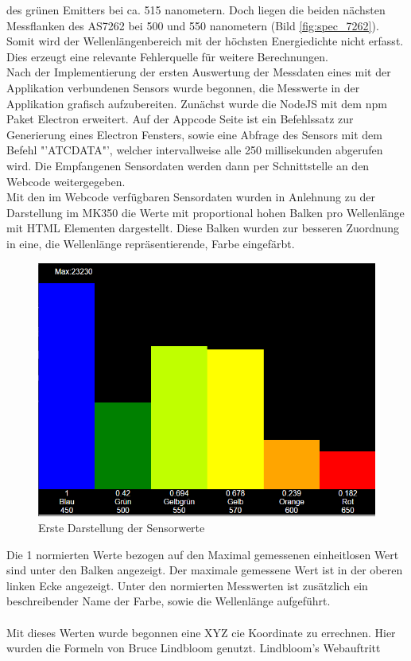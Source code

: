 \documentclass[11pt]{scrartcl}
\begin{document}
des grünen Emitters bei ca. 515 nanometern. Doch liegen die beiden nächsten Messflanken des AS7262 bei 500 und 550 nanometern (Bild \ref{fig:spec_7262}).
Somit wird der Wellenlängenbereich mit der höchsten Energiedichte nicht erfasst. Dies erzeugt eine relevante Fehlerquelle für weitere
Berechnungen.\\
Nach der Implementierung der ersten Auswertung der Messdaten eines mit der Applikation verbundenen Sensors wurde begonnen, die Messwerte in der
Applikation grafisch aufzubereiten. Zunächst wurde die NodeJS mit dem \ac{npm} Paket Electron erweitert. Auf der Appcode Seite ist ein Befehlssatz
zur Generierung eines Electron Fensters, sowie eine Abfrage des Sensors mit dem Befehl "'ATCDATA"', welcher intervallweise alle 250 millisekunden
abgerufen wird. Die Empfangenen Sensordaten werden dann per Schnittstelle an den Webcode weitergegeben.\\
Mit den im Webcode verfügbaren Sensordaten wurden in Anlehnung zu der Darstellung im MK350 die Werte mit proportional hohen Balken pro Wellenlänge
mit HTML Elementen dargestellt. Diese Balken wurden zur besseren Zuordnung in eine, die Wellenlänge repräsentierende, Farbe eingefärbt.
\begin{figure}[H]
    \begin{center}
        \includegraphics[width=.6\textwidth]{images/app_dummy_spectrum.png}
    \end{center}
    \caption{Erste Darstellung der Sensorwerte}
\end{figure}
\noindent
Die 1 normierten Werte bezogen auf den Maximal gemessenen einheitlosen Wert sind unter den Balken angezeigt. Der maximale gemessene Wert ist in der
oberen linken Ecke angezeigt. Unter den normierten Messwerten ist zusätzlich ein beschreibender Name der Farbe, sowie die Wellenlänge aufgeführt.\\
\\
Mit dieses Werten wurde begonnen eine XYZ \ac{cie} Koordinate zu errechnen. Hier wurden die Formeln von Bruce Lindbloom genutzt. Lindbloom's Webauftritt
\end{document}
